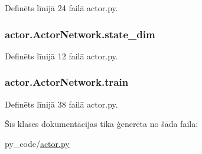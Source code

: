 Definēts līnijā 24 failā actor.\+py.

\subsubsection[{\texorpdfstring{state\+\_\+dim}{state_dim}}]{\setlength{\rightskip}{0pt plus 5cm}actor.\+Actor\+Network.\+state\+\_\+dim}\hypertarget{classactor_1_1_actor_network_a5a97fa085ad81efe114122af1cff8d26}{}\label{classactor_1_1_actor_network_a5a97fa085ad81efe114122af1cff8d26}


Definēts līnijā 12 failā actor.\+py.

\subsubsection[{\texorpdfstring{train}{train}}]{\setlength{\rightskip}{0pt plus 5cm}actor.\+Actor\+Network.\+train}\hypertarget{classactor_1_1_actor_network_a10e3ddfa0963a82bec05f3a0fa59d023}{}\label{classactor_1_1_actor_network_a10e3ddfa0963a82bec05f3a0fa59d023}


Definēts līnijā 38 failā actor.\+py.



Šīs klases dokumentācijas tika ģenerēta no šāda faila\+:\begin{DoxyCompactItemize}
\item 
py\+\_\+code/\hyperlink{actor_8py}{actor.\+py}\end{DoxyCompactItemize}
